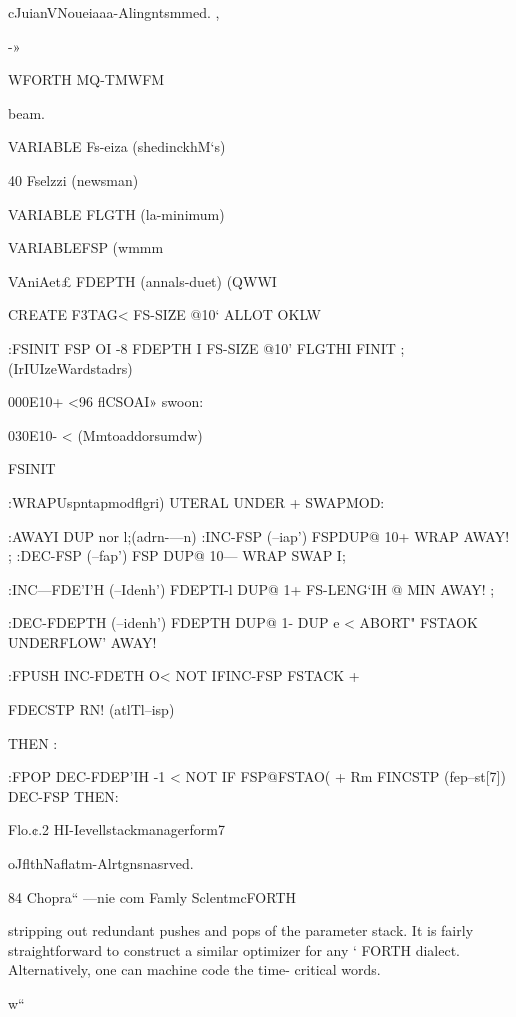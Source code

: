 cJuianVNoueiaaa-Alingntsmmed. ,

 

-»

 

WFORTH MQ-TMWFM

 

\noAnmmsermman

beam.

VARIABLE Fs-eiza (shedinckhM‘s)

40 Fselzzi (newsman)

VARIABLE FLGTH (la-minimum)

VARIABLEFSP (wmmm

VAniAet£ FDEPTH (annals-duet)
(QWWI

CREATE F3TAG< FS-SIZE @10‘ ALLOT OKLW

:FSINIT FSP OI -8 FDEPTH I FS-SIZE @10'
FLGTHI FINIT ; (IrIUIzeWardstadrs)

000E10+ <96 ﬂCSOAI» swoon:

030E10- <%
(Mmtoaddorsumdw)

FSINIT

:WRAPUspntapmodﬂgri) \rmkeiatnckdrcuar
[FLGTH@] UTERAL UNDER + SWAPMOD:

:AWAYI DUP nor l;(adrn-—n) \ueeiuieetoredwoie
:INC-FSP (--iap') FSPDUP@ 10+ WRAP AWAY! ;
:DEC-FSP (--fap') FSP DUP@ 10— WRAP SWAP I;

:INC—FDE’I'H (--Idenh')
FDEPTI-l DUP@ 1+ FS-LENG‘IH @ MIN
AWAY! ;

:DEC-FDEPTH (--idenh')
FDEPTH DUP@ 1- DUP e <
ABORT" FSTAOK UNDERFLOW' AWAY!

:FPUSH INC-FDETH O< NOT
IFINC-FSP FSTACK +

FDECSTP RN! (atlTl--isp)

THEN :

:FPOP DEC-FDEP'IH -1 < NOT
IF FSP@FSTAO( +
Rm FINCSTP (fep--st[7])
DEC-FSP THEN:

 

 

 

Flo.¢.2 HI-Ievellstackmanagerform7

oJﬂthNaﬂatm-Alrtgnsnasrved.

84 Chopra“ —nie com Famly SclentmcFORTH

stripping out redundant pushes and pops of the parameter stack.
It is fairly straightforward to construct a similar optimizer for any ‘
FORTH dialect. Alternatively, one can machine code the time-
critical words.

w“

